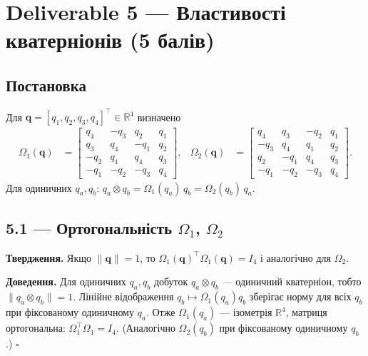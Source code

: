 \documentclass[11pt,a4paper]{article}
\newcommand{\R}{\mathbb{R}}
\begin{document}
\section{Deliverable 5 --- Властивості кватерніонів (5 балів)}

\subsection{Постановка}

Для $\bm{q} = [q_1,q_2,q_3,q_4]^\top \in \R^4$ визначено
\begin{align}
  \Omega_1(\bm{q}) &=
  \begin{bmatrix}
     q_4 & -q_3 &  q_2 & q_1 \\
     q_3 &  q_4 & -q_1 & q_2 \\
    -q_2 &  q_1 &  q_4 & q_3 \\
    -q_1 & -q_2 & -q_3 & q_4
  \end{bmatrix}, &
  \Omega_2(\bm{q}) &=
  \begin{bmatrix}
     q_4 &  q_3 & -q_2 & q_1 \\
    -q_3 &  q_4 &  q_1 & q_2 \\
     q_2 & -q_1 &  q_4 & q_3 \\
    -q_1 & -q_2 & -q_3 & q_4
  \end{bmatrix}.
\end{align}
Для одиничних $q_a,q_b$: $q_a \otimes q_b = \Omega_1(q_a)\,q_b = \Omega_2(q_b)\,q_a$.

\subsection{5.1 --- Ортогональність \texorpdfstring{$\Omega_1$, $\Omega_2$}{Omega1, Omega2}}

\textbf{Твердження.} Якщо $\|\bm{q}\|=1$, то $\Omega_1(\bm{q})^\top\Omega_1(\bm{q}) = I_4$ і аналогічно для $\Omega_2$.

\textbf{Доведення.} Для одиничних $q_a,q_b$ добуток $q_a\otimes q_b$ --- одиничний кватерніон, тобто $\|q_a\otimes q_b\|=1$.
Лінійне відображення $q_b \mapsto \Omega_1(q_a)q_b$ зберігає норму для всіх $q_b$ при фіксованому одиничному $q_a$.
Отже $\Omega_1(q_a)$ --- ізометрія $\R^4$, матриця ортогональна: $\Omega_1^\top\Omega_1 = I_4$.
(Аналогічно $\Omega_2(q_b)$ при фіксованому одиничному $q_b$.) \hfill$\square$
\end{document}
